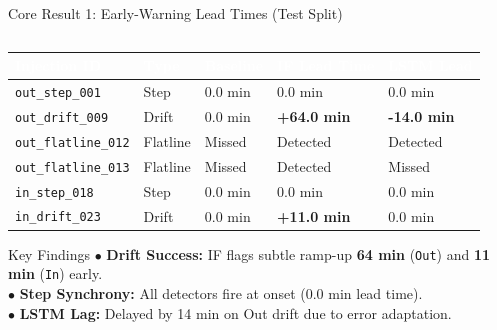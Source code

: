 \documentclass[aspectratio=169, 10pt]{beamer}
\begin{document}
\begin{frame}{Core Result 1: Early-Warning Lead Times (Test Split)}
    \begin{columns}[T]
        \begin{column}{0.55\textwidth}
            \centering
            \scriptsize
            \renewcommand{\arraystretch}{1.15}
            \begin{tabularx}{\textwidth}{L{2.0cm} C{0.8cm} C{1.2cm} C{1.3cm} C{1.3cm}}
                \toprule
                \textbf{\textcolor{white}{Injection ID}} & \textbf{\textcolor{white}{Type}} & \textbf{\textcolor{white}{Baseline}} & \textbf{\textcolor{white}{IF Lead Time}} & \textbf{\textcolor{white}{LSTM Lead}} \\
                \midrule
                \texttt{out\_step\_001}    & Step     & 0.0 min & 0.0 min & 0.0 min \\
                \texttt{out\_drift\_009}   & Drift    & 0.0 min & \textbf{\textcolor{EmeraldGreen}{+64.0 min}} & \textbf{\textcolor{CrimsonRed}{-14.0 min}} \\
                \texttt{out\_flatline\_012}& Flatline & Missed  & \textcolor{EmeraldGreen}{Detected} & \textcolor{EmeraldGreen}{Detected} \\
                \texttt{out\_flatline\_013}& Flatline & Missed  & \textcolor{EmeraldGreen}{Detected} & \textcolor{CrimsonRed}{Missed} \\
                \texttt{in\_step\_018}     & Step     & 0.0 min & 0.0 min & 0.0 min \\
                \texttt{in\_drift\_023}    & Drift    & 0.0 min & \textbf{\textcolor{EmeraldGreen}{+11.0 min}} & 0.0 min \\
                \bottomrule
            \end{tabularx}
            \vspace{6pt}
            \begin{block}{Key Findings}
                \footnotesize
                $\bullet$ \textbf{Drift Success:} IF flags subtle ramp-up \textbf{64 min} (\texttt{Out}) and \textbf{11 min} (\texttt{In}) early.\\
                $\bullet$ \textbf{Step Synchrony:} All detectors fire at onset (0.0 min lead time).\\
                $\bullet$ \textbf{LSTM Lag:} Delayed by 14 min on Out drift due to error adaptation.
            \end{block}
        \end{column}
        

\end{columns}
\end{frame}
\end{document}
